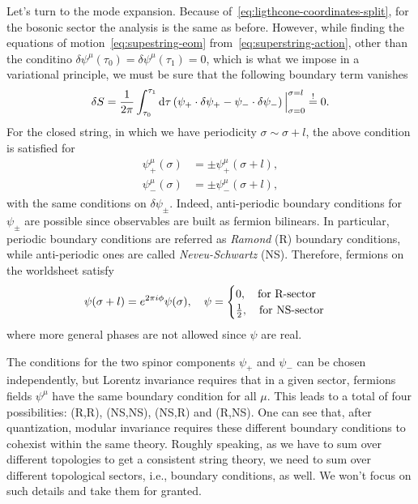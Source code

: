 Let's turn to the mode expansion. Because of~\eqref{eq:ligthcone-coordinates-split}, for the bosonic sector the analysis is the same as before. However, while finding the equations of motion~\eqref{eq:supestring-eom} from~\eqref{eq:superstring-action}, other than the conditino $\delta \psi^\mu (\tau_0) = \delta \psi^\mu (\tau_1) = 0$, which is what we impose in a variational principle, we must be sure that the following boundary term vanishes
\begin{equation}
    \delta S = \frac{1}{2\pi} \int_{\tau_0}^{\tau_1} \mathop{}\!\mathrm{d} \tau \left( \psi_+ \cdot \delta \psi_+ - \psi_- \cdot \delta \psi_- \right) \Big|_{\sigma = 0}^{\sigma = l}\overset{\mathrm{!}}{=} 0.
\end{equation}
For the closed string, in which we have periodicity $\sigma \sim \sigma + l$, the above condition is satisfied for
\begin{equation}
\begin{aligned}
    \psi^\mu_+ (\sigma) &= \pm \psi^\mu_+ (\sigma + l) ,\\
    \psi^\mu_- (\sigma) &= \pm \psi^\mu_- (\sigma + l) ,
\end{aligned}
\end{equation}
with the same conditions on $\delta \psi_\pm$. Indeed, anti-periodic boundary conditions for $\psi_\pm$ are possible since observables are built as fermion bilinears. In particular, periodic boundary conditions are referred as \emph{Ramond} (R) boundary conditions, while anti-periodic ones are called \emph{Neveu-Schwartz} (NS). Therefore, fermions on the worldsheet satisfy
\begin{equation}
    \psi (\sigma +l) = e^{2\pi i \phi} \psi(\sigma), \quad \psi = \begin{cases}
        0, \quad \textup{for R-sector} \\ \frac{1}{2}, \quad \textup{for NS-sector}
    \end{cases}
\end{equation}
where more general phases are not allowed since $\psi$ are real.

The conditions for the two spinor components $\psi_+$ and $\psi_-$ can be chosen independently, but Lorentz invariance requires that in a given sector, fermions fields $\psi^\mu$ have the same boundary condition for all $\mu$. This leads to a total of four possibilities: (R,R), (NS,NS), (NS,R) and (R,NS). One can see that, after quantization, modular invariance requires these different boundary conditions to cohexist within the same theory. Roughly speaking, as we have to sum over different topologies to get a consistent string theory, we need to sum over different topological sectors, i.e., boundary conditions, as well. We won't focus on such details and take them for granted.

